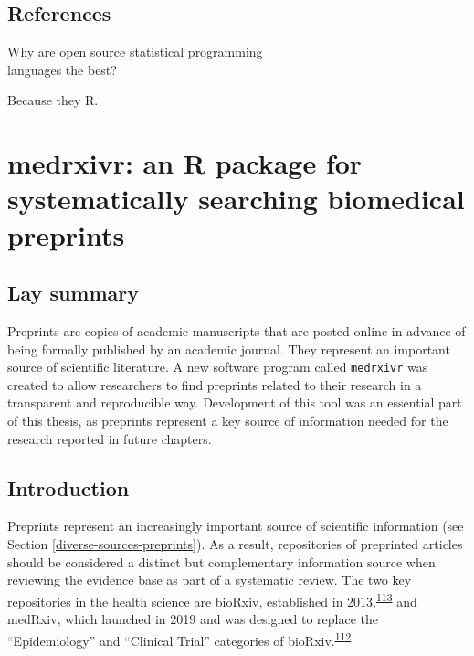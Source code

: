 \documentclass[a4paper, twoside]{templates/ociamthesis}
\begin{document}
\newpage

\hypertarget{references}{%
\section{References}\label{references}}

\begin{savequote}
Why are open source statistical programming\\
languages the best?

Because they R.
\end{savequote}



\hypertarget{sys-rev-tools-heading}{%
\chapter{medrxivr: an R package for systematically searching biomedical preprints}\label{sys-rev-tools-heading}}

\minitoc 

\hypertarget{lay-summary-1}{%
\section{Lay summary}\label{lay-summary-1}}

Preprints are copies of academic manuscripts that are posted online in advance of being formally published by an academic journal. They represent an important source of scientific literature. A new software program called \texttt{medrxivr} was created to allow researchers to find preprints related to their research in a transparent and reproducible way. Development of this tool was an essential part of this thesis, as preprints represent a key source of information needed for the research reported in future chapters.

\hypertarget{sys-rev-tools-intro}{%
\section{Introduction}\label{sys-rev-tools-intro}}

Preprints represent an increasingly important source of scientific information (see Section \ref{diverse-sources-preprints}). As a result, repositories of preprinted articles should be considered a distinct but complementary information source when reviewing the evidence base as part of a systematic review. The two key repositories in the health science are bioRxiv, established in 2013,\textsuperscript{\protect\hyperlink{ref-sever2019}{113}} and medRxiv, which launched in 2019 and was designed to replace the ``Epidemiology'' and ``Clinical Trial'' categories of bioRxiv.\textsuperscript{\protect\hyperlink{ref-rawlinson2019}{112}}
\end{document}

